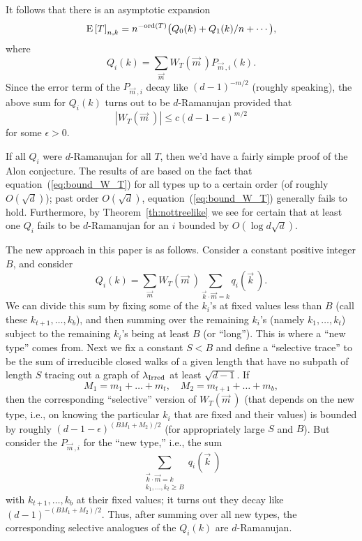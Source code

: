 \documentclass[12pt]{article}
\newcommand{\dtreelike}{{$d$-Ramanujan}}
\newcommand{\E}[1]{\mbox{E}\left[#1\right] }
\newcommand{\ird}[1]{{\rm Irred}_{#1}}
\begin{document}
It follows that there is an asymptotic expansion
$$
\E{T}_{n,k} = n^{-{\rm ord}(T)} \bigl( Q_0(k) + Q_1(k)/n + \cdots \bigr),
$$
where
\begin{equation}\label{eq:key_problem}
Q_i(k) = \sum_{\vec m} W_T(\vec m\>) P_{\vec m\>,i}(k).
\end{equation}
Since the error term of the
$P_{\vec m\>,i}$ decay like $(d-1)^{-m/2}$ (roughly speaking),
the above sum for $Q_i(k)$ turns out to be {\dtreelike}
provided
that
\begin{equation}\label{eq:bound_W_T}
|W_T(\vec m\>)| \le c(d-1-\epsilon)^{m/2}
\end{equation}
for some $\epsilon>0$.

If all $Q_i$ were {\dtreelike} for all $T$, then we'd have a
fairly simple proof of the Alon conjecture.  The results of
\cite{friedman_random_graphs} are based on the fact that
equation~(\ref{eq:bound_W_T}) for all types up to a certain order
(of roughly $O(\sqrt{d})$); past order $O(\sqrt{d})$,
equation~(\ref{eq:bound_W_T}) generally fails to hold.
Furthermore, by Theorem~\ref{th:nottreelike} we see
for certain that at least one $Q_i$ fails to be {\dtreelike} for
an $i$ bounded by $O(\log d\sqrt{d})$.

The new approach in this paper is as follows.  Consider a
constant positive integer $B$, and consider
$$
Q_i(k) = \sum_{\vec m} W_T(\vec m\>) 
\sum_{\vec k\cdot \vec m=k} q_i(\vec k\>).
$$
We can divide this sum by fixing some of the $k_i$'s at fixed values
less than $B$ (call these $k_{t+1},\ldots,k_b$), and then summing
over the remaining $k_i$'s (namely $k_1,\ldots,k_t$) subject to
the remaining $k_i$'s being at least $B$ (or ``long'').  
This is where a ``new type'' comes from.
Next we fix a constant
$S<B$ and define a
``selective trace'' to be the sum of irreducible closed walks of a given
length that have no subpath of length $S$ tracing out a graph of
$\lambda_{\ird{}}$ at least $\sqrt{d-1}$.  If
$$
M_1=m_1+\ldots+m_t,\quad M_2=m_{t+1}+\ldots+m_b,
$$
then the corresponding ``selective'' version of $W_T(\vec m\>)$ 
(that depends on the new type, i.e., on knowing the particular $k_i$ that
are fixed and their values) is bounded by roughly
$(d-1-\epsilon)^{(BM_1+M_2)/2}$ (for appropriately large $S$ and $B$).
But consider
the $P_{\vec m\>,i}$ for the ``new type,'' i.e., the sum
$$
\sum_{\substack{\vec k\cdot \vec m=k \\ k_1,\ldots,k_t\ge B}} q_i(\vec k\>)
$$
with $k_{t+1},\ldots,k_b$ at their fixed values; it turns out they
decay like $(d-1)^{-(BM_1+M_2)/2}$.
Thus, after summing over all new types,
the corresponding selective analogues of the $Q_i(k)$ are {\dtreelike}.
\end{document}
